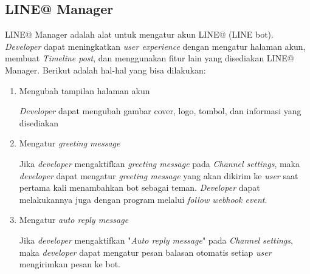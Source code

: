 \subsection{LINE@ Manager}
LINE@ Manager adalah alat untuk mengatur akun LINE@ (LINE bot). \textit{Developer} dapat meningkatkan \textit{user experience} dengan mengatur halaman akun, membuat \textit{Timeline post}, dan menggunakan fitur lain yang disediakan LINE@ Manager. Berikut adalah hal-hal yang bisa dilakukan:
\begin{enumerate}
\item Mengubah tampilan halaman akun

\textit{Developer} dapat mengubah gambar cover, logo, tombol, dan informasi yang disediakan

\item Mengatur \textit{greeting message}

Jika \textit{developer} mengaktifkan \textit{greeting message} pada \textit{Channel settings}, maka \textit{developer} dapat mengatur \textit{greeting message} yang akan dikirim ke \textit{user} saat pertama kali menambahkan bot sebagai teman. \textit{Developer} dapat melakukannya juga dengan program melalui \textit{follow webhook event}.

\item Mengatur \textit{auto reply message}

Jika \textit{developer} mengaktifkan "\textit{Auto reply message}" pada \textit{Channel settings}, maka \textit{developer} dapat mengatur pesan balasan otomatis setiap \textit{user} mengirimkan pesan ke bot.
\end{enumerate}

